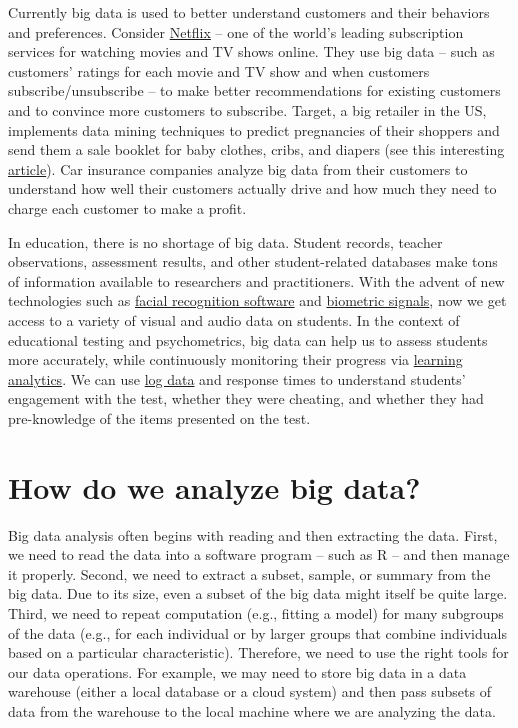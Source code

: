 \documentclass[]{book}
\begin{document}
Currently big data is used to better understand customers and their behaviors and preferences. Consider \href{https://www.netflix.com}{Netflix} -- one of the world's leading subscription services for watching movies and TV shows online. They use big data -- such as customers' ratings for each movie and TV show and when customers subscribe/unsubscribe -- to make better recommendations for existing customers and to convince more customers to subscribe. Target, a big retailer in the US, implements data mining techniques to predict pregnancies of their shoppers and send them a sale booklet for baby clothes, cribs, and diapers (see this interesting \href{https://www.driveresearch.com/single-post/2016/12/06/How-Target-Used-Data-Analytics-to-Predict-Pregnancies}{article}). Car insurance companies analyze big data from their customers to understand how well their customers actually drive and how much they need to charge each customer to make a profit.

In education, there is no shortage of big data. Student records, teacher observations, assessment results, and other student-related databases make tons of information available to researchers and practitioners. With the advent of new technologies such as \href{https://www.edweek.org/ew/articles/2016/01/13/the-future-of-big-data-and-analytics.html}{facial recognition software} and \href{https://www.smartdatacollective.com/jay-z-kanye-west-used-biometrics-beat-album-leaks/}{biometric signals}, now we get access to a variety of visual and audio data on students. In the context of educational testing and psychometrics, big data can help us to assess students more accurately, while continuously monitoring their progress via \href{https://isit.arts.ubc.ca/learning-analytics-examples/}{learning analytics}. We can use \href{https://link.springer.com/content/pdf/10.1007\%2Fs41237-018-0063-y.pdf}{log data} and response times to understand students' engagement with the test, whether they were cheating, and whether they had pre-knowledge of the items presented on the test.

\hypertarget{how-do-we-analyze-big-data}{%
\section{How do we analyze big data?}\label{how-do-we-analyze-big-data}}

Big data analysis often begins with reading and then extracting the data. First, we need to read the data into a software program -- such as R -- and then manage it properly. Second, we need to extract a subset, sample, or summary from the big data. Due to its size, even a subset of the big data might itself be quite large. Third, we need to repeat computation (e.g., fitting a model) for many subgroups of the data (e.g., for each individual or by larger groups that combine individuals based on a particular characteristic). Therefore, we need to use the right tools for our data operations. For example, we may need to store big data in a data warehouse (either a local database or a cloud system) and then pass subsets of data from the warehouse to the local machine where we are analyzing the data.
\end{document}
